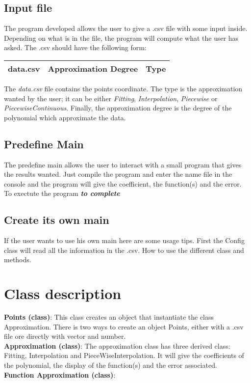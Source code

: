 \documentclass[12pt]{article}
\begin{document}
\subsection{Input file}
The program developed allows the user to give a .csv file with some input inside. Depending on what is in the file, the program will compute what the user has asked. The .csv should have the following form:\\
\begin{center}
\begin{tabular}{|c|c|c|}
\hline
data.csv & Approximation Degree & Type  \\
\hline
\end{tabular} 
\end{center}
The \emph{data.csv} file contains the points coordinate. The type is the approximation wanted by the user; it can be either \emph{Fitting}, \emph{Interpolation}, \emph{Piecewise} or \emph{PiecewiseContinuous}. Finally, the approximation degree  is the degree of the polynomial which approximate the data.\\

\subsection{Predefine Main}
The predefine main allows the user to interact with a small program that gives the results wanted. Just compile the program and enter the name file in the console and the program will give the coefficient, the function(s) and the error.
To exectute the program \textbf{\emph{to complete}}

\subsection{Create its own main}
If the user wants to use his own main here are some usage tips. First the Config class will read all the information in the .csv. 
How to use the different class and methods.

\section{Class description}
\textbf{Points (class)}: This class creates an object that instantiate the class Approximation. There is two ways to create an object Points, either with a .csv file ore directly with vector and number.\\
\textbf{Approximation (class)}: The approximation class has three derived class: Fitting, Interpolation and PieceWiseInterpolation. It will give the coefficients of the polynomial, the display of the function(s) and the error associated.\\
\textbf{Function Approximation (class)}:
\end{document}
